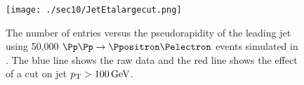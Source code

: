 \begin{figure}[htbp]
\centering
\texttt{[image: ./sec10/JetEtalargecut.png]}
\caption{The number of entries versus the pseudorapidity of the leading jet using 50,000 $\Pp\Pp \rightarrow \Ppositron \Pelectron$ events simulated in \madgraph. The blue line shows the raw data and the red line shows the effect of a cut on jet $p_{\mathrm{T}} > 100\,\text{G\text{e\kern-0.15ex V}}$.}
\end{figure}


